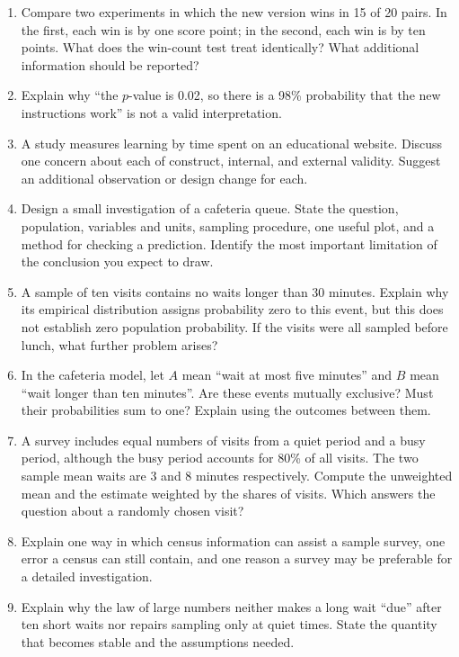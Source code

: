 \begin{enumerate}
adding the six binomial coefficients for $k=15,\ldots,20$. Explain why the
calculation concerns the assignment of labels under the null hypothesis.
\item Compare two experiments in which the new version wins in 15 of 20
pairs. In the first, each win is by one score point; in the second, each
win is by ten points. What does the win-count test treat identically?
What additional information should be reported?
\item Explain why ``the $p$-value is 0.02, so there is a 98\% probability that
the new instructions work'' is not a valid interpretation.
\item A study measures learning by time spent on an educational website.
Discuss one concern about each of construct, internal, and external
validity. Suggest an additional observation or design change for each.
\item Design a small investigation of a cafeteria queue. State the
question, population, variables and units, sampling procedure, one useful
plot, and a method for checking a prediction. Identify the most important
limitation of the conclusion you expect to draw.
\item A sample of ten visits contains no waits longer than 30 minutes.
Explain why its empirical distribution assigns probability zero to this
event, but this does not establish zero population probability. If the
visits were all sampled before lunch, what further problem arises?
\item In the cafeteria model, let $A$ mean ``wait at most five minutes''
and $B$ mean ``wait longer than ten minutes''. Are these events mutually
exclusive? Must their probabilities sum to one? Explain using the outcomes
between them.
\item A survey includes equal numbers of visits from a quiet period and
a busy period, although the busy period accounts for 80\% of all visits.
The two sample mean waits are 3 and 8 minutes respectively. Compute the
unweighted mean and the estimate weighted by the shares of visits.
Which answers the question about a randomly chosen visit?
\item Explain one way in which census information can assist a sample
survey, one error a census can still contain, and one reason a survey
may be preferable for a detailed investigation.
\item Explain why the law of large numbers neither makes a long wait
``due'' after ten short waits nor repairs sampling only at quiet times.
State the quantity that becomes stable and the assumptions needed.

\end{enumerate}
